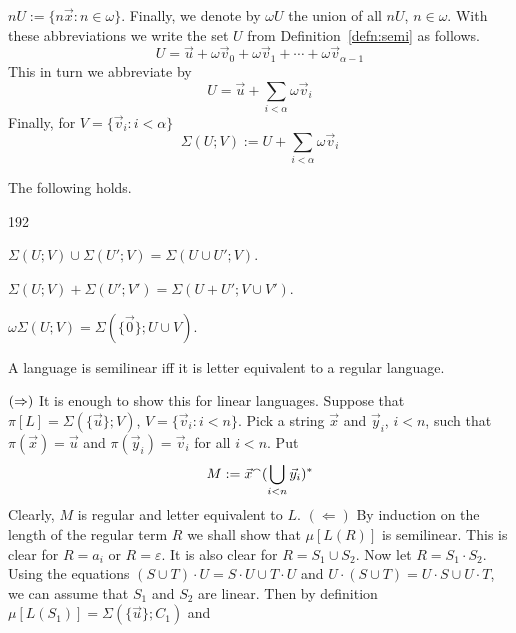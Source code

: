 $n U := \{n\vec{x} : n \in \omega\}$. Finally, we denote by 
$\omega U$ the union of all $n U$, $n \in \omega$. With these 
abbreviations we write the set $U$ from Definition~\ref{defn:semi} 
as follows.
\begin{equation}
U = \vec{u} + \omega \vec{v}_0 + \omega \vec{v}_1 + \dotsb + 
\omega \vec{v}_{\alpha-1} 
\end{equation}
This in turn we abbreviate by
\begin{equation}
U = \vec{u} + \sum_{i < \alpha} \omega \vec{v}_i
\end{equation}
Finally, for $V = \{\vec{v}_i : i < \alpha\}$
\begin{equation}
\Sigma(U;V) := U + \sum_{i < \alpha}  \omega \vec{v}_i
\end{equation}
\begin{lem}
\label{lem:sigmaeig}
The following holds.
\begin{dingautolist}{192}
\item $\Sigma(U;V) \cup \Sigma(U';V) = \Sigma(U \cup U';V)$.
\item $\Sigma(U;V) + \Sigma(U';V') = \Sigma(U + U'; V\cup V')$.
\item $\omega \Sigma(U;V) = \Sigma(\{\vec{0}\};U \cup V)$. 
\end{dingautolist}
\end{lem}
\begin{thm}[Parikh]
A language is semilinear iff it is letter equivalent to a
regular language.
\end{thm}
\proofbeg
$(\Rightarrow)$ It is enough to show this for linear languages. Suppose 
that $\pi[L] = \Sigma(\{\vec{u}\};V)$, $V = \{\vec{v}_i : i < n\}$. 
Pick a string $\vec{x}$ and $\vec{y}_i$, $i < n$, such that 
$\pi(\vec{x}) = \vec{u}$ and $\pi(\vec{y}_i) = \vec{v}_i$ for 
all $i < n$. Put  
\begin{equation}
M := \vec{x}{^{\smallfrown}} (\bigcup_{i < n} \vec{y}_i)^{\ast}
\end{equation}
Clearly, $M$ is regular and letter equivalent to $L$.
$(\Leftarrow)$ By induction on the length of the regular term $R$
we shall show that $\mu[L(R)]$ is semilinear. This is clear for
$R = a_i$ or $R = \varepsilon$. It is also clear for
$R = S_1 \cup S_2$. Now let $R = S_1 \cdot S_2$. Using the equations 
$(S \cup T) \cdot U = S \cdot U \cup T \cdot U$
and $U \cdot (S \cup T) = U \cdot S \cup U \cdot T$, we can 
assume that $S_1$ and $S_2$ are linear. Then by definition 
$\mu[L(S_1)] = \Sigma(\{\vec{u}\};C_1)$ and 
